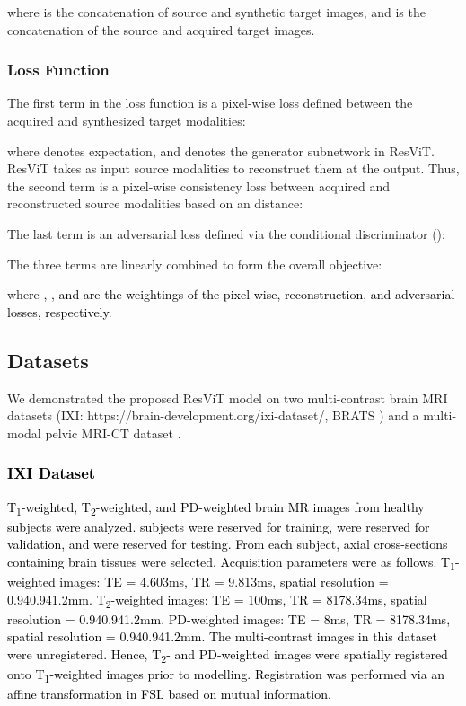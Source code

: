 \documentclass[journal,twoside,web]{ieeecolor}
\newcommand{\Tone}{T\textsubscript{1}}
\newcommand{\Ttwo}{T\textsubscript{2}}
\newcommand*{\revhl}{\textcolor{black}}
\begin{document}
where  is the concatenation of source and synthetic target images, and  is the concatenation of the source and acquired target images.

\subsubsection{Loss Function} The first term in the loss function is a pixel-wise  loss defined between the acquired and synthesized target modalities:

where  denotes expectation, and  denotes the generator subnetwork in ResViT. ResViT takes as input source modalities to reconstruct them at the output. Thus, the second term is a pixel-wise consistency loss between acquired and reconstructed source modalities based on an  distance:

The last term is an adversarial loss defined via the conditional discriminator ():

The three terms are linearly combined to form the overall objective:

where \revhl{, , and  are the weightings of the pixel-wise, reconstruction, and adversarial losses, respectively.}



\vspace{-3mm}
\subsection{Datasets}
We demonstrated the proposed ResViT model on two multi-contrast brain MRI datasets (IXI: https://brain-development.org/ixi-dataset/, BRATS \cite{brats_1,brats_2,brats_3}) and a multi-modal pelvic MRI-CT dataset \cite{mr_ct_dataset}.
\subsubsection{\revhl{IXI Dataset}} \revhl{\Tone-weighted, \Ttwo-weighted, and PD-weighted brain MR images from  healthy subjects were analyzed.  subjects were reserved for training,  were reserved for validation, and  were reserved for testing. From each subject,  axial cross-sections containing brain tissues were selected. Acquisition parameters were as follows. \Tone-weighted images: TE = 4.603ms, TR = 9.813ms, spatial resolution = 0.940.941.2mm.
\Ttwo-weighted images: TE = 100ms, TR = 8178.34ms, spatial resolution = 0.940.941.2mm.
PD-weighted images: TE = 8ms, TR = 8178.34ms, spatial resolution = 0.940.941.2mm. The multi-contrast images in this dataset were unregistered. Hence, \Ttwo- and PD-weighted images were spatially registered onto \Tone-weighted images prior to modelling. Registration was performed via an affine transformation in FSL \cite{fslcitation} based on mutual information.} 
\end{document}
